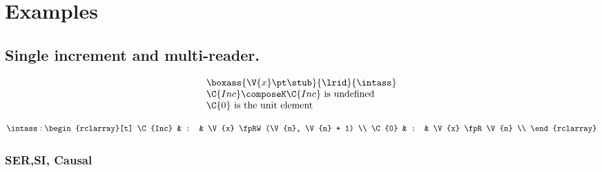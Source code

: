 \section{Examples\label{sec:example}}




\subsection{Single increment and multi-reader.}

\[
    \begin{array}{@{}l@{}}
        \boxass{\V{x} \pt \stub}{\lrid}{\intass} \\
        \C{Inc} \composeK \C{Inc} \text{ is undefined} \\
        \C{0} \text{ is the unit element} \\
    \end{array}
\]

\[
    \begin{array}{@{}l@{}}
        \intass : 
        \begin{rclarray}[t]
        \C{Inc} & : & \V{x} \fpRW (\V{n}, \V{n} + 1)  \\
        \C{0}  & : & \V{x} \fpR \V{n} \\ 
        \end{rclarray} \\
    \end{array}
\]

\subsubsection{SER,SI, Causal}

